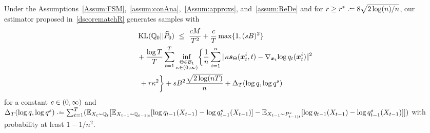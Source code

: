 \begin{theorem}\label{the:maindS}
Under the Assumptions~\ref{Assum:FSM},~\ref{assum:conAna},~\ref{Assum:approxs}, and~\ref{assum:ReDe} and
    for $\tuning\ge \tuningorc\deq 8\sqrt{2\log (n)/n}$, our estimator proposed in~\eqref{dscorematchR}  generates samples with
    \begin{align*}
     &\KL(\Fd_0 ||\BdA_0)
     ~\le~\frac{\COr \FSM}{T^2}+\frac{\COr}{T}\max\{1,(s\DerBound)^2\} \\%
     &+\frac{\log T}{T}  \sum_{t=1}^{T}\inf_{\substack{\NetP\in \paramspaceone\\ \scale\in (0,\infty)}}\biggl\{\frac{1}{n} \sum_{i=1}^{n}  \norm{\scale\scoref(\x_t^i,t)-\nabla_{\x_t}\!\log\Fdd_t(\x_t^i)}^2\\
      &~+\tuning\scale^2\biggr\}
      + s\DerBound^2\frac{\sqrt{2\log (nT)}}{n}
      +\Delta_{T} (\log \Fdd,\log \Fdds)
\end{align*}
for a constant $c\in (0,\infty)$ and $\Delta_{T} (\log \Fdd,\log \Fdds)
    \deq \sum_{t=1}^{T} (\E_{X_{t}\sim \Fd_{t}}[\E_{X_{t-1}\sim \Fd_{t-1|t}}[\log \Fdd_{t-1}(X_{t-1})-\log \Fdds_{t-1}(X_{t-1})]\notag-\E_{X_{t-1}\sim \Bds_{t-1|t}}[\log \Fdd_{t-1}(X_{t-1})-\log \Fdds_{t-1}(X_{t-1})]])$ with probability at least $1-1/n^2$.
\end{theorem}
